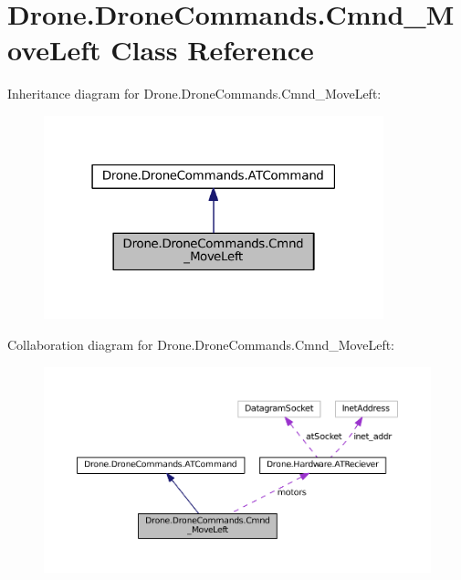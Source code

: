 \hypertarget{class_drone_1_1_drone_commands_1_1_cmnd___move_left}{}\section{Drone.\+Drone\+Commands.\+Cmnd\+\_\+\+Move\+Left Class Reference}
\label{class_drone_1_1_drone_commands_1_1_cmnd___move_left}


Inheritance diagram for Drone.\+Drone\+Commands.\+Cmnd\+\_\+\+Move\+Left\+:\nopagebreak
\begin{figure}[H]
\begin{center}
\leavevmode
\includegraphics[width=279pt]{class_drone_1_1_drone_commands_1_1_cmnd___move_left__inherit__graph}
\end{center}
\end{figure}


Collaboration diagram for Drone.\+Drone\+Commands.\+Cmnd\+\_\+\+Move\+Left\+:\nopagebreak
\begin{figure}[H]
\begin{center}
\leavevmode
\includegraphics[width=350pt]{class_drone_1_1_drone_commands_1_1_cmnd___move_left__coll__graph}
\end{center}
\end{figure}
